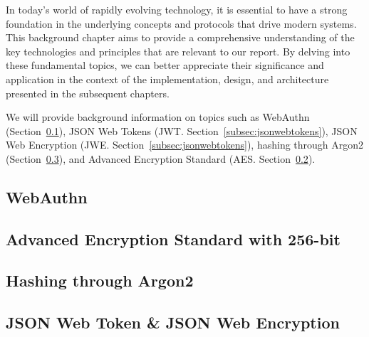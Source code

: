 
In today's world of rapidly evolving technology, it is essential to have a
strong foundation in the underlying concepts and protocols that drive modern
systems.
This background chapter aims to provide a comprehensive understanding of the key
technologies and principles that are relevant to our report.
By delving into these fundamental topics, we can better appreciate their
significance and application in the context of the implementation, design, and
architecture presented in the subsequent chapters.


We will provide background information on topics such as WebAuthn
(Section~\ref{subsec:webauthn}), JSON Web Tokens (JWT\@.
Section~\ref{subsec:jsonwebtokens}), JSON Web Encryption (JWE\@.
Section~\ref{subsec:jsonwebtokens}), hashing through Argon2
(Section~\ref{subsec:hashing-through-argon2}), and Advanced Encryption Standard
(AES. Section~\ref{subsec:aes}).


\subsection{WebAuthn}\label{subsec:webauthn}


\subsection{Advanced Encryption Standard with 256-bit}\label{subsec:aes}


\subsection{Hashing through Argon2}\label{subsec:hashing-through-argon2}


\subsection{JSON Web Token \& JSON Web Encryption}\label{subsec:json-web-tokens}\label{subsec:jsonwebtokens}

